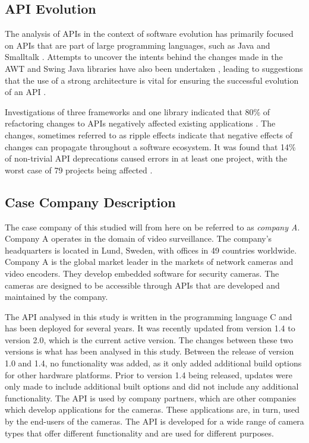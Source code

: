 \documentclass{sig-alternate}
\begin{document}
\subsection{API Evolution} \label{related_work}
The analysis of APIs in the context of software evolution has primarily focused on APIs that are part of large programming languages, such as Java \cite{hou2011exploring, shi2011empirical} and Smalltalk \cite{robbes2012developers}. Attempts to uncover the intents behind the changes made in the AWT and Swing Java libraries have also been undertaken \cite{hou2011exploring}, leading to suggestions that the use of a strong architecture is vital for ensuring the successful evolution of an API \cite{hou2011exploring}.

Investigations of three frameworks and one library indicated that 80\% of refactoring changes to APIs negatively affected existing applications \cite{dig2005role}. The changes, sometimes referred to as ripple effects \cite{robbes2012developers} indicate that negative effects of changes can propagate throughout a software ecosystem. It was found that 14\% of non-trivial API deprecations caused errors in at least one project, with the worst case of 79 projects being affected \cite{robbes2012developers}.




\subsection{Case Company Description} \label{case_company_description}
The case company of this studied will from here on be referred to as \textit{company A}. Company A operates in the domain of video surveillance. The company's headquarters is located in Lund, Sweden, with offices in 49 countries worldwide. Company A is the global market leader in the markets of network cameras and video encoders. They develop embedded software for security cameras. The cameras are designed to be accessible through APIs that are developed and maintained by the company. 

The API analysed in this study is written in the programming language C and has been deployed for several years. It was recently updated from version 1.4 to version 2.0, which is the current active version. The changes between these two versions is what has been analysed in this study. Between the release of version 1.0 and 1.4, no functionality was added, as it only added additional build options for other hardware platforms. Prior to version 1.4 being released, updates were only made to include additional built options and did not include any additional functionality. The API is used by company partners, which are other companies which develop applications for the cameras. These applications are, in turn, used by the end-users of the cameras. The API is developed for a wide range of camera types that offer different functionality and are used for different purposes. 
\end{document}

